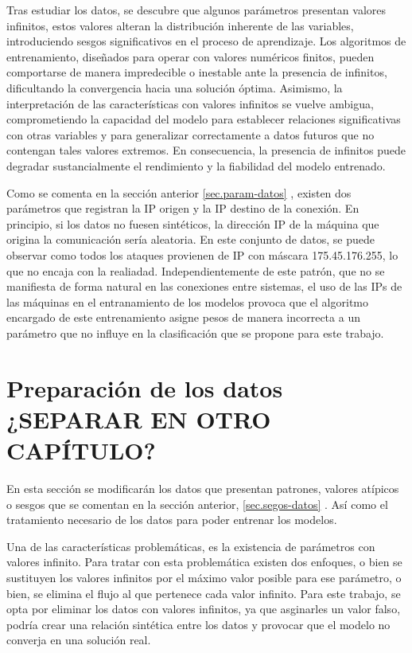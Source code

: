 Tras estudiar los datos, se descubre que algunos parámetros presentan valores infinitos, estos valores alteran la distribución inherente de las variables, introduciendo sesgos significativos en el proceso de aprendizaje. Los algoritmos de entrenamiento, diseñados para operar con valores numéricos finitos, pueden comportarse de manera impredecible o inestable ante la presencia de infinitos, dificultando la convergencia hacia una solución óptima. Asimismo, la interpretación de las características con valores infinitos se vuelve ambigua, comprometiendo la capacidad del modelo para establecer relaciones significativas con otras variables y para generalizar correctamente a datos futuros que no contengan tales valores extremos. En consecuencia, la presencia de infinitos puede degradar sustancialmente el rendimiento y la fiabilidad del modelo entrenado.

Como se comenta en la sección anterior \ref{sec.param-datos} , existen dos parámetros que registran la IP origen y la IP destino de la conexión. En principio, si los datos no fuesen sintéticos, la dirección IP de la máquina que origina la comunicación sería aleatoria. En este conjunto de datos, se puede observar como todos los ataques provienen de IP con máscara 175.45.176.255, lo que no encaja con la realiadad. Independientemente de este patrón, que no se manifiesta de forma natural en las conexiones entre sistemas, el uso de las IPs de las máquinas en el entranamiento de los modelos provoca que el algoritmo encargado de este entrenamiento asigne pesos de manera incorrecta a un parámetro que no influye en la clasificación que se propone para este trabajo.



\section{Preparación de los datos ¿SEPARAR EN OTRO CAPÍTULO?}\label{sec.prep-datos}
En esta sección se modificarán los datos que presentan patrones, valores atípicos o sesgos que se comentan en la sección anterior, \ref{sec.segos-datos} . Así como el tratamiento necesario de los datos para poder entrenar los modelos.

Una de las características problemáticas, es la existencia de parámetros con valores infinito. Para tratar con esta problemática existen dos enfoques, o bien se sustituyen los valores infinitos por el máximo valor posible para ese parámetro, o bien, se elimina el flujo al que pertenece cada valor infinito. Para este trabajo, se opta por eliminar los datos con valores infinitos, ya que asginarles un valor falso, podría crear una relación sintética entre los datos y provocar que el modelo no converja en una solución real.

